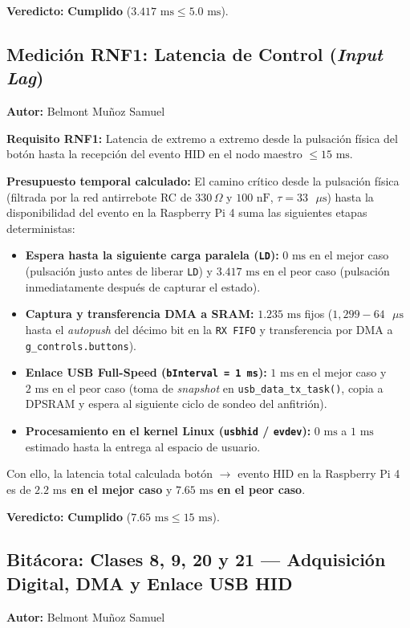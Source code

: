 \textbf{Veredicto:} \textbf{Cumplido} ($3.417\text{ ms} \le 5.0\text{ ms}$).

\subsection{Medición RNF1: Latencia de Control (\textit{Input Lag})}
\textbf{Autor:} Belmont Muñoz Samuel

\textbf{Requisito RNF1:} Latencia de extremo a extremo desde la pulsación física del botón hasta la recepción del evento HID en el nodo maestro $\le 15\text{ ms}$.

\textbf{Presupuesto temporal calculado:} El camino crítico desde la pulsación física (filtrada por la red antirrebote RC de $330\,\Omega$ y $100\text{ nF}$, $\tau = 33\text{ }\mu\text{s}$) hasta la disponibilidad del evento en la Raspberry Pi 4 suma las siguientes etapas deterministas:
\begin{itemize}
	\item \textbf{Espera hasta la siguiente carga paralela (\texttt{LD}):} $0\text{ ms}$ en el mejor caso (pulsación justo antes de liberar \texttt{LD}) y $3.417\text{ ms}$ en el peor caso (pulsación inmediatamente después de capturar el estado).
	\item \textbf{Captura y transferencia DMA a SRAM:} $1.235\text{ ms}$ fijos ($1{,}299 - 64\text{ }\mu\text{s}$ hasta el \textit{autopush} del décimo bit en la \texttt{RX FIFO} y transferencia por DMA a \texttt{g\_controls.buttons}).
	\item \textbf{Enlace USB Full-Speed (\texttt{bInterval = 1 ms}):} $1\text{ ms}$ en el mejor caso y $2\text{ ms}$ en el peor caso (toma de \textit{snapshot} en \texttt{usb\_data\_tx\_task()}, copia a DPSRAM y espera al siguiente ciclo de sondeo del anfitrión).
	\item \textbf{Procesamiento en el kernel Linux (\texttt{usbhid} / \texttt{evdev}):} $0\text{ ms}$ a $1\text{ ms}$ estimado hasta la entrega al espacio de usuario.
\end{itemize}
Con ello, la latencia total calculada botón $\rightarrow$ evento HID en la Raspberry Pi 4 es de \textbf{$2.2\text{ ms}$ en el mejor caso} y \textbf{$7.65\text{ ms}$ en el peor caso}.

\textbf{Veredicto:} \textbf{Cumplido} ($7.65\text{ ms} \le 15\text{ ms}$).

\subsection{Bitácora: Clases 8, 9, 20 y 21 — Adquisición Digital, DMA y Enlace USB HID}
\textbf{Autor:} Belmont Muñoz Samuel

